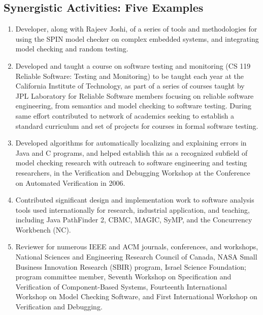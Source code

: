 \documentclass[fleqn,11pt]{article}
\renewcommand{\$}[1]{$#1$}
\begin{document}
\subsection*{Synergistic Activities: Five Examples}
\begin{enumerate}
\item Developer, along with Rajeev Joshi, of a series of tools and methodologies for using the SPIN model checker on complex embedded systems, and integrating model checking and random testing.

\item Developed and taught a course on software testing and monitoring (CS 119 Reliable Software:  Testing and Monitoring) to be taught each year at the California Institute of Technology, as part of a series of courses taught by JPL Laboratory for Reliable Software members focusing on reliable software engineering, from semantics and model checking to software testing.  During same effort contributed to network of academics seeking to establish a standard curriculum and set of projects for courses in formal software testing.

\item Developed algorithms for automatically localizing and explaining errors in Java and C programs, and helped establish this as a recognized subfield of model checking research with outreach to software engineering and testing researchers, in the Verification and Debugging Workshop at the Conference on Automated Verification in 2006.

\item Contributed significant design and implementation work to software analysis tools used internationally for research, industrial application, and teaching, including Java PathFinder 2, CBMC, MAGIC, SyMP, and the Concurrency Workbench (NC).

\item Reviewer for numerous IEEE and ACM journals, conferences, and workshops, National Sciences and Engineering Research Council of Canada, NASA Small Business Innovation Research (SBIR) program, Israel Science Foundation; program committee member, Seventh Workshop on Specification and Verification of Component-Based Systems, Fourteenth International Workshop on Model Checking Software, and First International Workshop on Verification and Debugging.
\end{enumerate}
\end{document}

